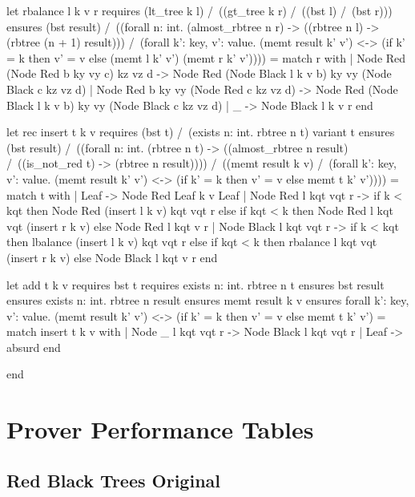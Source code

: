 \begin{whylang}
  let rbalance l k v r
  requires { (lt_tree k l) /\ ((gt_tree k r) /\ ((bst l) /\ (bst r))) }
  ensures { (bst result) /\ ((forall n: int. (almost_rbtree n r) -> ((rbtree n l) -> (rbtree (n + 1) result))) /\ (forall k': key, v': value. (memt result k' v') <-> (if k' = k then v' = v else (memt l k' v') \/ (memt r k' v')))) } 
 = match r with
  | Node Red (Node Red b ky vy c) kz vz d -> Node Red (Node Black l k v b) ky vy (Node Black c kz vz d)
  | Node Red b ky vy (Node Red c kz vz d) -> Node Red (Node Black l k v b) ky vy (Node Black c kz vz d)
  | _ -> Node Black l k v r
  end

  let rec insert t k v
  requires { (bst t) /\ (exists n: int. rbtree n t) }
  variant { t }
  ensures { (bst result) /\ ((forall n: int. (rbtree n t) -> ((almost_rbtree n result) /\ ((is_not_red t) -> (rbtree n result)))) /\ ((memt result k v) /\ (forall k': key, v': value. (memt result k' v') <-> (if k' = k then v' = v else memt t k' v')))) } 
 = match t with
  | Leaf -> Node Red Leaf k v Leaf
  | Node Red l kqt vqt r -> if k < kqt then Node Red (insert l k v) kqt vqt r else if kqt < k then Node Red l kqt vqt (insert r k v) else Node Red l kqt v r
  | Node Black l kqt vqt r -> if k < kqt then lbalance (insert l k v) kqt vqt r else if kqt < k then rbalance l kqt vqt (insert r k v) else Node Black l kqt v r
  end

  

  let add t k v
  requires { bst t }
  requires { exists n: int. rbtree n t }
  ensures { bst result }
  ensures { exists n: int. rbtree n result }
  ensures { memt result k v }
  ensures { forall k': key, v': value. (memt result k' v') <-> (if k' = k then v' = v else memt t k' v') } 
 = match insert t k v with
  | Node _ l kqt vqt r -> Node Black l kqt vqt r
  | Leaf -> absurd
  end

end
\end{whylang}

\newcommand{\explanation}[1]{\cellcolor{green!20}#1}
\newcommand{\noresult}{\cellcolor{gray!20}---}
\newcommand{\blank}{\cellcolor{gray!20}}
\newcommand{\valid}[1]{\cellcolor{green!20}#1}

\section{Prover Performance Tables}
\label{sec:Prover_Performance_Tables}

\subsection{Red Black Trees Original \whyml}
\label{subsec:Red_Black_Trees_Original_Whyml}

